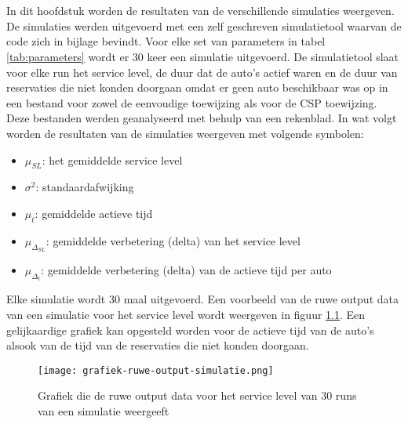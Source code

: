 \chapter{}
\label{ch:resultaten-simulaties}
In dit hoofdstuk worden de resultaten van de verschillende simulaties weergeven. De simulaties werden uitgevoerd met een zelf geschreven simulatietool waarvan de code zich in bijlage bevindt. Voor elke set van parameters in tabel \ref{tab:parameters} wordt er 30 keer een simulatie uitgevoerd. De simulatietool slaat voor elke run het service level, de duur dat de auto's actief waren en de duur van reservaties die niet konden doorgaan omdat er geen auto beschikbaar was op in een bestand voor zowel de eenvoudige toewijzing als voor de CSP toewijzing. Deze bestanden werden geanalyseerd met behulp van een rekenblad.
In wat volgt worden de resultaten van de simulaties weergeven met volgende symbolen:
\begin{itemize}
	\item $\mu_{ SL}$: het gemiddelde service level
	\item $\sigma^2$: standaardafwijking
	\item $\mu_{ t}$: gemiddelde actieve tijd
	\item $\mu_{\Delta_{ SL}}$: gemiddelde verbetering (delta) van het service level
	\item $\mu_{\Delta_{ t}}$: gemiddelde verbetering (delta) van de actieve tijd per auto
\end{itemize}
Elke simulatie wordt 30 maal uitgevoerd. Een voorbeeld van de ruwe output data van een simulatie voor het service level wordt weergeven in figuur \ref{grafiek:ruwe-output-simulatie}. Een gelijkaardige grafiek kan opgesteld worden voor de actieve tijd van de auto's alsook van de tijd van de reservaties die niet konden doorgaan.
\begin{figure}[h]
	\texttt{[image: grafiek-ruwe-output-simulatie.png]}
	\caption[Grafiek die de ruwe output data voor het service level van 30 runs van een simulatie weergeeft]{Grafiek die de ruwe output data voor het service level van 30 runs van een simulatie weergeeft}
	\label{grafiek:ruwe-output-simulatie}
\end{figure}

